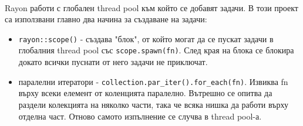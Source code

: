 \paragraph*{} Rayon работи с глобален thread pool към който се добавят задачи. В този проект са използвани главно два начина за създаване на задачи:
\begin{itemize}
\item \verb|rayon::scope()| - създава "блок", от който могат да се пускат задачи в глобалния thread pool със \verb|scope.spawn(fn)|. След края на блока се блокира докато всички пуснати от него задачи не приключат.
\item паралелни итератори - \verb|collection.par_iter().for_each(fn)|. Извиква fn върху всеки елемент от коленцията паралелно. Вътрешно се опитва да раздели колекцията на няколко части, така че всяка нишка да работи върху отделна част. Отново самото изпълнение се случва в thread pool-а.
\end{itemize}
